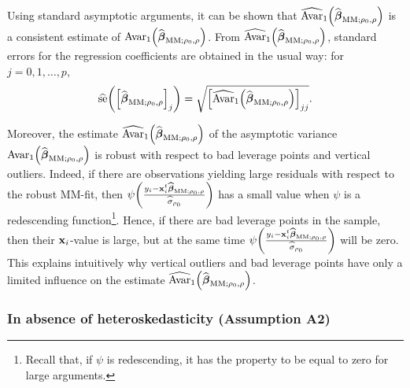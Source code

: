 Using standard asymptotic arguments, it can be shown that $\widehat
{\mathrm{Avar}}_{1}\left(  \sthat{\boldsymbol\beta}_{\mathrm{MM};\rho
_{0},\rho}\right)  $ is a consistent estimate of $\mathrm{Avar}_{1}\left(
\sthat{\boldsymbol\beta}_{\mathrm{MM};\rho_{0},\rho}\right)  $. From
$\sthat{\mathrm{Avar}}_{1}\left(  \sthat{\boldsymbol\beta}%
_{\mathrm{MM};\rho_{0},\rho}\right)  $, standard errors for the regression
coefficients are obtained in the usual way: for $j=0,1,\ldots,p$,
\[
\sthat{\mathrm{se}}\left(  \left[  \sthat{\boldsymbol\beta}%
_{\mathrm{MM};\rho_{0},\rho}\right]  _{j}\right)  =\sqrt{\left[
\sthat{\mathrm{Avar}}_{1}\left(  \sthat{\boldsymbol\beta}_{\mathrm{MM}%
;\rho_{0},\rho}\right)  \right]  _{jj}}.
\]


Moreover, the estimate $\sthat{\mathrm{Avar}}_{1}\left(  \widehat
{\boldsymbol\beta}_{\mathrm{MM};\rho_{0},\rho}\right)  $ of the asymptotic
variance $\mathrm{Avar}_{1}\left(  \sthat{\boldsymbol\beta}_{\mathrm{MM}%
;\rho_{0},\rho}\right)  $ is robust with respect to bad leverage points and
vertical outliers. Indeed, if there are observations yielding large residuals
with respect to the robust MM-fit, then $\psi\left(  \frac{y_{i}%
-\stvec{x}_{i}^{t}\sthat{\boldsymbol\beta}_{\mathrm{MM};\rho_{0},\rho}%
}{\sthat{\sigma}_{\rho_{0}}}\right)  $ has a small value when $\psi$ is a
redescending function\footnote{Recall that, if $\psi$ is redescending, it has
the property to be equal to zero for large arguments.}. Hence, if there are
bad leverage points in the sample, then their $\mathbf x_{i}$-value is large,
but at the same time $\psi\left(  \frac{y_{i}-\stvec{x}_{i}^{t}%
\sthat{\boldsymbol\beta}_{\mathrm{MM};\rho_{0},\rho}}{\sthat{\sigma
}_{\rho_{0}}}\right)  $ will be zero. This explains intuitively why vertical
outliers and bad leverage points have only a limited influence on the estimate
$\sthat{\mathrm{Avar}}_{1}\left(  \sthat{\boldsymbol\beta}%
_{\mathrm{MM};\rho_{0},\rho}\right)  $.

\subsubsection{In absence of heteroskedasticity (Assumption A2)}

